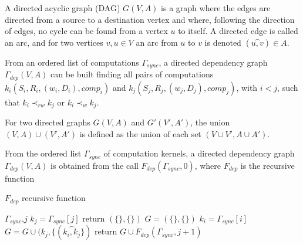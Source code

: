 \begin{mydef}
A directed acyclic graph (DAG) $G(V,A)$ is a graph where the edges are directed from a source to a destination vertex and where, following the direction of edges, no cycle can be found from a vertex $u$ to itself. A directed edge is called an arc, and for two vertices $v,u \in V$ an arc from $u$ to $v$ is denoted $(\overset{\frown}{u,v}) \in A$.
\end{mydef}

From an ordered list of computations $\Gamma_{sync}$, a directed dependency graph $\Gamma_{dep}(V,A)$ can be built finding all pairs of computations $k_i(S_i,R_i,(w_i,D_i),comp_i)$ and $k_j(S_j,R_j,(w_j,D_j),comp_j)$, with $i<j$, such that $k_i \prec_{rw} k_j$ or $k_i \prec_w k_j$. 

\begin{mydef}
For two directed graphs $G(V,A)$ and $G'(V',A')$, the union $(V,A)\cup (V',A')$ is defined as the union of each set $(V\cup V', A \cup A')$.
\end{mydef}

\begin{mydef}
From the ordered list $\Gamma_{sync}$ of computation kernels, a directed dependency graph $\Gamma_{dep}(V,A)$ is obtained from the call $F_{dep}(\Gamma_{sync},0)$, where $F_{dep}$ is the recursive function

\begin{algorithm}
\caption{$F_{dep}$ recursive function}
\label{alg:sync}
\begin{algorithmic}[1]
 {$\Gamma_{sync}$,$j$}
\State $k_j = \Gamma_{sync}[j]$
\State return $(\{\},\{\})$
\State $G=(\{\},\{\})$
\State $k_i = \Gamma_{sync}[i]$
\State $G = G \cup (k_j, \{(\overset{\frown}{k_i,k_j} \})$
\EndIf
\EndFor
\State return $G \cup F_{dep}(\Gamma_{sync},j+1)$
\EndIf
\EndProcedure
\end{algorithmic}
\end{algorithm}

\end{mydef}

